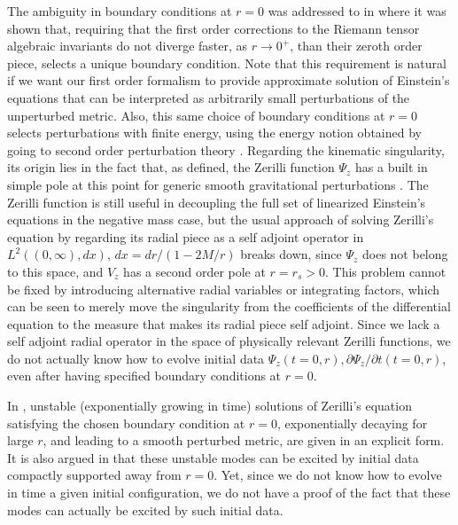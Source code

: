 \documentclass[aps,floats,showpacs,amssymb,tightenlines]{revtex4}
\def\p{\partial}
\begin{document}
The ambiguity in boundary conditions at $r=0$ was addressed to in \cite{ghi,dg} where it was shown  that, requiring
that the first order corrections to the Riemann tensor algebraic invariants do not diverge faster, as $r \to 0^+$, than
their zeroth order piece,
selects a unique boundary condition. Note that this requirement is natural if we want our first order
formalism to provide approximate solution of Einstein's equations that can be interpreted as arbitrarily small perturbations of the unperturbed metric. Also, this same choice of boundary conditions at
$r=0$
selects perturbations with finite energy, using the energy notion obtained by going to
second order perturbation theory \cite{ghi}.   Regarding
the kinematic singularity, its origin lies in the fact that, as defined, the Zerilli function $\Psi_z$ has a built in simple pole
at this point for generic smooth gravitational perturbations \cite{dg}. The Zerilli function is still useful in
decoupling the full set of linearized Einstein's equations in the negative mass case, but the usual
approach of solving Zerilli's equation  by regarding its radial piece as a self adjoint operator in $L^2((0,\infty),dx)$,
$dx=dr / (1-2M/r)$
breaks down, since $\Psi_z$ does not belong to this space, and $V_z$ has a second order pole
at $r=r_s>0$. This problem cannot be fixed by introducing alternative radial variables or integrating factors, which
can be seen to merely move the singularity from the coefficients of the differential equation to the measure
that makes its radial piece self adjoint. Since we lack a self adjoint radial operator in the space of physically relevant
Zerilli functions, we do not actually know how to evolve initial data $\Psi_z(t=0,r), \p \Psi_z / \p t (t=0,r)$, even after having specified boundary conditions at $r=0$.

In \cite{dg}, unstable (exponentially growing in time) solutions of Zerilli's equation satisfying the chosen
boundary condition at $r=0$, exponentially decaying for large $r$,
and leading to a smooth perturbed metric, are  given in an explicit form. It is also argued in \cite{dg}
that these unstable modes can be excited by initial data  compactly supported
away from $r=0$. Yet, since we do not know how to evolve in time a given initial configuration, we do not
have a proof of the fact that these modes can actually be excited by such  initial data.
\end{document}
